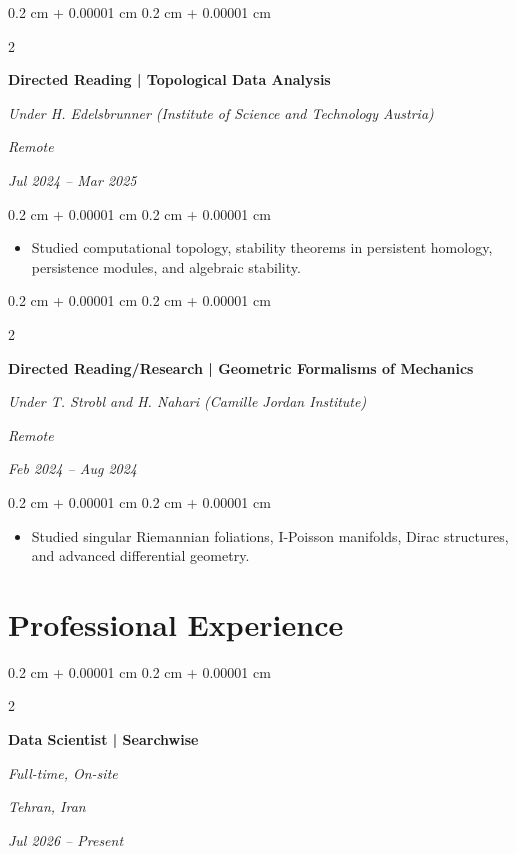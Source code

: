 \documentclass[10pt, letterpaper]{article}
\newenvironment{highlights}{
    \begin{itemize}[
        topsep=0.05 cm,
        parsep=0.04 cm,
        partopsep=0pt,
        itemsep=0pt,
        leftmargin=0.4 cm + 10pt
    ]
}{
    \end{itemize}
} %
\newenvironment{onecolentry}{
    \begin{adjustwidth}{
        0.2 cm + 0.00001 cm
    }{
        0.2 cm + 0.00001 cm
    }
}{
    \end{adjustwidth}
} %
\newenvironment{twocolentry}[2][]{
    \onecolentry
    \def\secondColumn{#2}
    \setcolumnwidth{\fill, 4.5 cm}
    \begin{paracol}{2}
}{
    \switchcolumn \raggedleft \secondColumn
    \end{paracol}
    \endonecolentry
} %
\begin{document}
        \vspace{0.14 cm}

        \begin{twocolentry}{
            \textit{Remote}

            \textit{Jul 2024 -- Mar 2025}}
            \textbf{Directed Reading | Topological Data Analysis}

            \textit{Under H. Edelsbrunner (Institute of Science and Technology Austria)}
        \end{twocolentry}

        \vspace{0.08 cm}
        \begin{onecolentry}
            \begin{highlights}
                \item Studied computational topology, stability theorems in persistent homology, persistence modules, and algebraic stability.
            \end{highlights}
        \end{onecolentry}

        \vspace{0.14 cm}

        \begin{twocolentry}{
            \textit{Remote}

            \textit{Feb 2024 -- Aug 2024}}
            \textbf{Directed Reading/Research | Geometric Formalisms of Mechanics}

            \textit{Under T. Strobl and H. Nahari (Camille Jordan Institute)}
        \end{twocolentry}

        \vspace{0.08 cm}
        \begin{onecolentry}
            \begin{highlights}
                \item Studied singular Riemannian foliations, I-Poisson manifolds, Dirac structures, and advanced differential geometry.
            \end{highlights}
        \end{onecolentry}

    \section{Professional Experience}

        \begin{twocolentry}{
            \textit{Tehran, Iran}

            \textit{Jul 2026 -- Present}}
            \textbf{Data Scientist | Searchwise}

            \textit{Full-time, On-site}
        \end{twocolentry}
\end{document}
